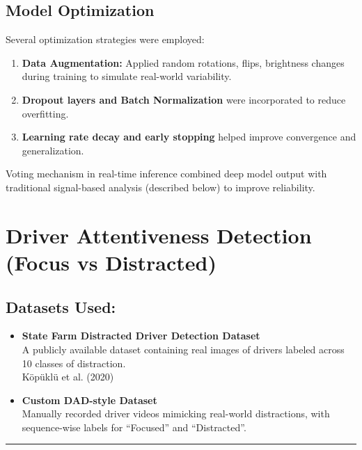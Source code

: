 \documentclass[
  letterpaper,
  DIV=11,
  numbers=noendperiod]{scrreport}
\begin{document}
\subsection{Model Optimization}\label{model-optimization}

Several optimization strategies were employed:

\begin{enumerate}
\def\labelenumi{\arabic{enumi}.}
\item
  \textbf{Data Augmentation:} Applied random rotations, flips,
  brightness changes during training to simulate real-world variability.
\item
  \textbf{Dropout layers and Batch Normalization} were incorporated to
  reduce overfitting.
\item
  \textbf{Learning rate decay and early stopping} helped improve
  convergence and generalization.
\end{enumerate}

Voting mechanism in real-time inference combined deep model output with
traditional signal-based analysis (described below) to improve
reliability.

\section{\texorpdfstring{\textbf{Driver Attentiveness Detection (Focus
vs
Distracted)}}{Driver Attentiveness Detection (Focus vs Distracted)}}\label{driver-attentiveness-detection-focus-vs-distracted}

\subsection{Datasets Used:}\label{datasets-used}

\begin{itemize}
\item
  \textbf{State Farm Distracted Driver Detection Dataset}\\
  A publicly available dataset containing real images of drivers labeled
  across 10 classes of distraction.\\
  Köpüklü et al. (2020)
\item
  \textbf{Custom DAD-style Dataset}\\
  Manually recorded driver videos mimicking real-world distractions,
  with sequence-wise labels for ``Focused'' and ``Distracted''.
\end{itemize}

\begin{center}\rule{0.5\linewidth}{0.5pt}\end{center}
\end{document}
